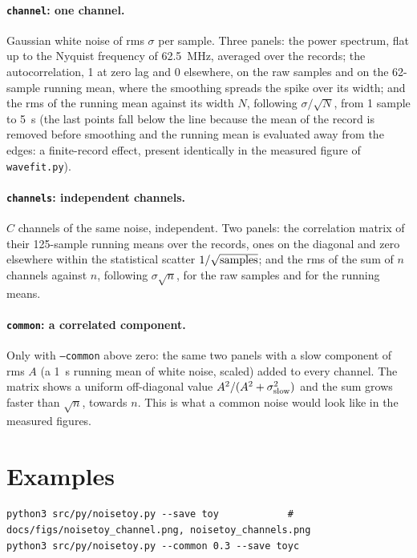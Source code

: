 \documentclass[11pt]{article}
\newcommand{\code}[1]{\texttt{#1}}
\newcommand{\us}{\textmu s}
\begin{document}
\paragraph{\code{channel}: one channel.} Gaussian white noise of rms
$\sigma$ per sample. Three panels: the power spectrum, flat up to the
Nyquist frequency of 62.5~MHz, averaged over the records; the
autocorrelation, 1 at zero lag and 0 elsewhere, on the raw samples and
on the 62-sample running mean, where the smoothing spreads the spike
over its width; and the rms of the running mean against its width $N$,
following $\sigma/\sqrt N$, from 1 sample to 5~\us{} (the last points fall below the line because the mean of the
record is removed before smoothing and the running mean is evaluated away from the edges: a finite-record effect,
present identically in the measured figure of \code{wavefit.py}).

\paragraph{\code{channels}: independent channels.} $C$ channels of the
same noise, independent. Two panels: the correlation matrix of their
125-sample running means over the records, ones on the diagonal and
zero elsewhere within the statistical scatter $1/\sqrt{\rm samples}$;
and the rms of the sum of $n$ channels against $n$, following
$\sigma\sqrt n$, for the raw samples and for the running means.

\paragraph{\code{common}: a correlated component.} Only with
\code{--common} above zero: the same two panels with a slow component
of rms $A$ (a 1~\us{} running mean of white noise, scaled) added to
every channel. The matrix shows a uniform off-diagonal value
$A^2/(A^2 + \sigma_{\rm slow}^2)$ and the sum grows faster than
$\sqrt n$, towards $n$. This is what a common noise would look like in
the measured figures.

\section{Examples}

\begin{lstlisting}
python3 src/py/noisetoy.py --save toy            # docs/figs/noisetoy_channel.png, noisetoy_channels.png
python3 src/py/noisetoy.py --common 0.3 --save toyc
\end{lstlisting}
\end{document}
